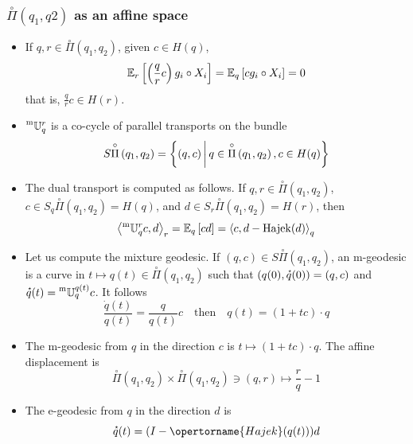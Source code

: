 \documentclass[xcolor=svgnames]{beamer}
\newcommand{\openplan}[2]{\overset{\circ}\Pi\left(#1,#2\right)}
\begin{document}
\begin{frame}\small\frametitle{$\openplan{q_1}{q2}$ as an affine space}
\begin{itemize}
\item If $q , r \in \openplan {q_1} {q_2}$, given $c \in H(q)$,
\begin{equation*}
\expectat r {\left(\frac q r c\right) g_i \circ X_i} = \expectat q {c g_i \circ X_i} = 0
\end{equation*}
that is, $\frac q r c \in H(r)$.
\item $\mtransport q r$ is a co-cycle of parallel transports on the bundle
\begin{equation*}
    S \openplan {q_1}{q_2} = \setof {(q,c)}{ q \in \openplan {q_1}{q_2}, c \in H(q)} 
\end{equation*}
\item The dual transport is computed as follows. If $q, r \in \openplan {q_1}{q_2}$, $c \in S_q \openplan {q_1}{q_2} = H(q)$, and $d \in S_r \openplan {q_1}{q_2} = H(r)$, then
\begin{equation*}
\scalarat r {\mtransport q r c} d = \expectat q {cd} = \scalarat q c {d - \operatorname{Hajek}(d)}
\end{equation*}
\item Let us compute the mixture geodesic. If $(q,c) \in S \openplan {q_1}{q_2}$, an m-geodesic is a curve in $t \mapsto q(t) \in \openplan {q_1}{q_2}$ such that $(q(0),\velocity q(0)) = (q,c)$ and $\velocity q(t) = \mtransport q {q(t)} c$. It follows
\begin{equation*}
    \frac {\dot q(t)}{q(t)} = \frac q {q(t)} c \quad \text{then} \quad q(t) = (1 +tc) \cdot q
\end{equation*}
\item The m-geodesic from $q$ in the direction $c$ is $t \mapsto (1+tc)\cdot q$. The affine displacement is
\begin{equation*}
 \openplan {q_1}{q_2} \times  \openplan {q_1}{q_2} \ni (q,r) \mapsto \frac r q - 1
\end{equation*}
\item The e-geodesic from $q$ in the direction $d$ is 
\begin{equation*}
\velocity q(t) = (I - \opertorname{Hajek}(q(t)))d 
\end{equation*}

\end{itemize}

\end{frame}
\end{document}
